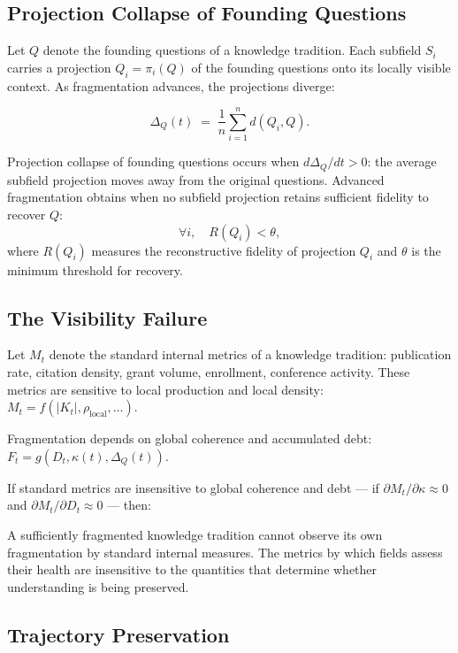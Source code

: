 \subsection*{Projection Collapse of Founding Questions}

Let $Q$ denote the founding questions of a knowledge tradition. Each subfield
$S_i$ carries a projection $Q_i = \pi_i(Q)$ of the founding questions onto
its locally visible context. As fragmentation advances, the projections diverge:

\[
\Delta_Q(t)
\;=\;
\frac{1}{n}\sum_{i=1}^n d(Q_i, Q).
\]

Projection collapse of founding questions occurs when $d\Delta_Q/dt > 0$:
the average subfield projection moves away from the original questions.
Advanced fragmentation obtains when no subfield projection retains sufficient
fidelity to recover $Q$:
\[
\forall i, \quad R(Q_i) < \theta,
\]
where $R(Q_i)$ measures the reconstructive fidelity of projection $Q_i$
and $\theta$ is the minimum threshold for recovery.

\subsection*{The Visibility Failure}

Let $M_t$ denote the standard internal metrics of a knowledge tradition:
publication rate, citation density, grant volume, enrollment, conference
activity. These metrics are sensitive to local production and local density:
$M_t = f(|K_t|, \rho_{\mathrm{local}}, \ldots)$.

Fragmentation depends on global coherence and accumulated debt:
$F_t = g(D_t, \kappa(t), \Delta_Q(t))$.

If standard metrics are insensitive to global coherence and debt --- if
$\partial M_t / \partial \kappa \approx 0$ and
$\partial M_t / \partial D_t \approx 0$ --- then:

\begin{proposition}
A sufficiently fragmented knowledge tradition cannot observe its own
fragmentation by standard internal measures. The metrics by which fields
assess their health are insensitive to the quantities that determine whether
understanding is being preserved.
\end{proposition}

\subsection*{Trajectory Preservation}

